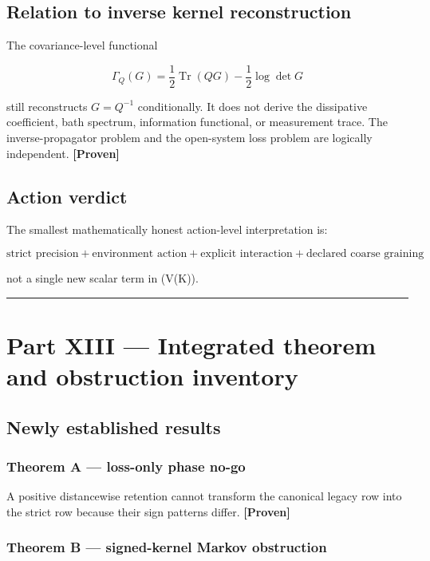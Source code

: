 \documentclass[11pt,a4paper,openany]{report}
\newcommand{\statusProven}{\textcolor{fingreen}{[Proven]}}
\begin{document}
\section{Relation to inverse kernel reconstruction}

The covariance-level functional

\[
\Gamma_Q(G)
=\frac12\operatorname{Tr}(QG)
-\frac12\log\det G
\]

still reconstructs \(G=Q^{-1}\) conditionally. It does not derive the dissipative coefficient, bath spectrum, information functional, or measurement trace. The inverse-propagator problem and the open-system loss problem are logically independent. \textbf{\statusProven{}}

\section{Action verdict}

The smallest mathematically honest action-level interpretation is:

\[
\boxed{
\text{strict precision}
+\text{environment action}
+\text{explicit interaction}
+\text{declared coarse graining}
}
\]

not a single new scalar term in (V(K)).

\par\medskip\hrule\medskip

\chapter{Part XIII — Integrated theorem and obstruction inventory}

\section{Newly established results}

\subsection{Theorem A — loss-only phase no-go}

A positive distancewise retention cannot transform the canonical legacy row into the strict row because their sign patterns differ. \textbf{\statusProven{}}

\subsection{Theorem B — signed-kernel Markov obstruction}
\end{document}
